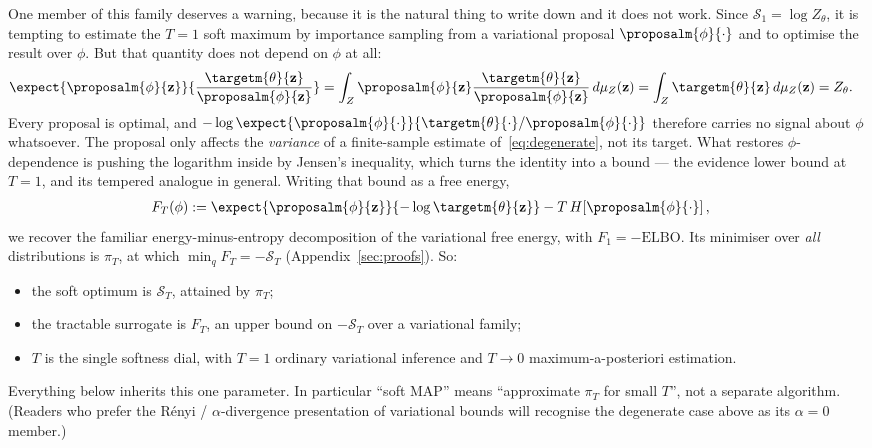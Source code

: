 One member of this family deserves a warning, because it is the natural thing to write down and it does not work. Since $\mathcal{S}_1 = \log Z_{\theta}$, it is tempting to estimate the $T = 1$ soft maximum by importance sampling from a variational proposal $\proposalm{\phi}{\cdot}$ and to optimise the result over $\phi$. But that quantity does not depend on $\phi$ at all:
\begin{align}
    \label{eq:degenerate}
    \expect{\proposalm{\phi}{\mathbf{z}}}{\frac{\targetm{\theta}{\mathbf{z}}}{\proposalm{\phi}{\mathbf{z}}}} &= \int_Z \proposalm{\phi}{\mathbf{z}} \frac{\targetm{\theta}{\mathbf{z}}}{\proposalm{\phi}{\mathbf{z}}} \, d\mu_Z(\mathbf{z}) = \int_Z \targetm{\theta}{\mathbf{z}} \, d\mu_Z(\mathbf{z}) = Z_{\theta} .
\end{align}
Every proposal is optimal, and $-\log \expect{\proposalm{\phi}{\cdot}}{\targetm{\theta}{\cdot} / \proposalm{\phi}{\cdot}}$ therefore carries no signal about $\phi$ whatsoever. The proposal only affects the \emph{variance} of a finite-sample estimate of~\eqref{eq:degenerate}, not its target. What restores $\phi$-dependence is pushing the logarithm inside by Jensen's inequality, which turns the identity into a bound --- the evidence lower bound at $T = 1$, and its tempered analogue in general. Writing that bound as a free energy,
\begin{align}
    \label{eq:free_energy}
    F_T(\phi) &:= \expect{\proposalm{\phi}{\mathbf{z}}}{- \log \targetm{\theta}{\mathbf{z}}} - T \, H\!\left[\proposalm{\phi}{\cdot}\right],
\end{align}
we recover the familiar energy-minus-entropy decomposition of the variational free energy, with $F_1 = -\mathrm{ELBO}$. Its minimiser over \emph{all} distributions is $\pi_T$, at which $\min_q F_T = -\mathcal{S}_T$ (Appendix~\ref{sec:proofs}). So:
\begin{itemize}
    \item the soft optimum is $\mathcal{S}_T$, attained by $\pi_T$;
    \item the tractable surrogate is $F_T$, an upper bound on $-\mathcal{S}_T$ over a variational family;
    \item $T$ is the single softness dial, with $T = 1$ ordinary variational inference and $T \rightarrow 0$ maximum-a-posteriori estimation.
\end{itemize}
Everything below inherits this one parameter. In particular ``soft MAP'' means ``approximate $\pi_T$ for small $T$'', not a separate algorithm. (Readers who prefer the R\'{e}nyi / $\alpha$-divergence presentation of variational bounds will recognise the degenerate case above as its $\alpha = 0$ member.)

